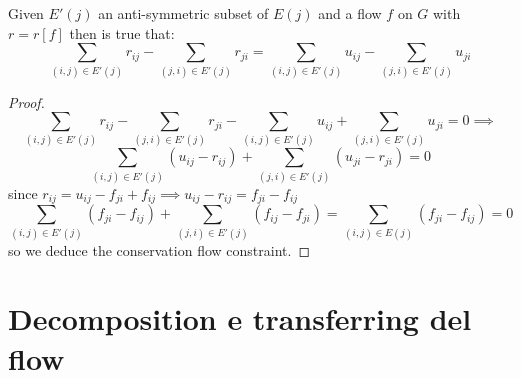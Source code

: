 \begin{lemma}

    Given $E'(j)$ an anti-symmetric subset of $E(j)$ and a flow $f$ on $G$ with $r = r[f]$ then is true that:
    \[\sum_{(i,j)\in E'(j)}r_{ij} - \sum_{(j,i)\in E'(j)}r_{ji} = \sum_{(i,j)\in E'(j)}u_{ij} - \sum_{(j,i)\in E'(j)}u_{ji} \]
\end{lemma}
\begin{proof}
    \[\sum_{(i,j)\in E'(j)}r_{ij} - \sum_{(j,i)\in E'(j)}r_{ji} -\sum_{(i,j)\in E'(j)}u_{ij} + \sum_{(j,i)\in E'(j)}u_{ji}= 0 \implies\]
    \[\sum_{(i,j)\in E'(j)}(u_{ij}-r_{ij}) + \sum_{(j,i)\in E'(j)}(u_{ji}-r_{ji}) = 0 \]
    since $r_{ij} = u_{ij} - f_{ji} + f_{ij} \implies u_{ij} -r_{ij} = f_{ji}- f_{ij}$ 
    \[\sum_{(i,j)\in E'(j)}(f_{ji}-f_{ij}) + \sum_{(j,i)\in E'(j)}(f_{ij}-f_{ji}) = \sum_{(i,j)\in E(j)}(f_{ji}-f_{ij}) = 0\]
    so we deduce the conservation flow constraint. 
    \QED
\end{proof}
\section{Decomposition e transferring del flow}


